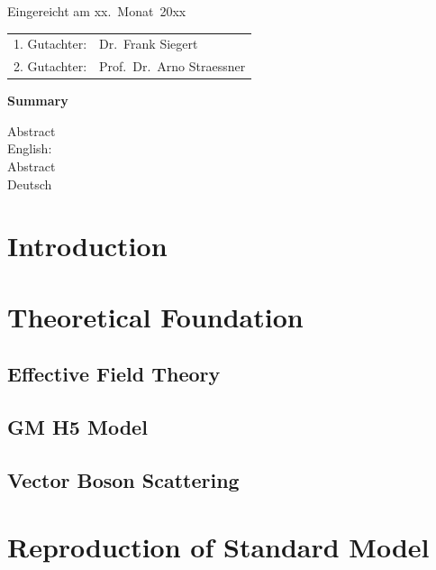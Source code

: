    
   \thispagestyle{empty}\vspace*{48em}
   
   Eingereicht am xx.~Monat~20xx\vspace{1.5em}
   \par{\large\begin{tabular}{ll}
    1. Gutachter: & Dr.~Frank Siegert \\
    2. Gutachter: & Prof.~Dr.~Arno Straessner  \\
   \end{tabular}}
   
   
   \newpage
   \begin{center}\large\bfseries Summary\end{center}
   
   
   Abstract \\ 
   English: \\
   
   \vspace{20em}
   Abstract \\ 
   Deutsch \\
    
    
\tableofcontents

\pagebreak
\chapter{Introduction}
    

\chapter{Theoretical Foundation}
    \section{Effective Field Theory}
        
        

    \section{GM H5 Model}
        
    

    \section{Vector Boson Scattering}
        
 
\pagebreak
\chapter{Reproduction of Standard Model}
